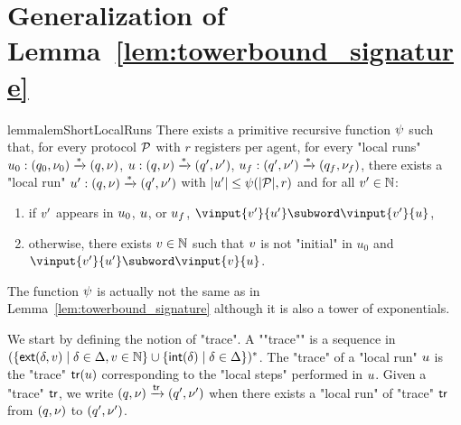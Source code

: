 \section{Generalization of Lemma~\ref{lem:towerbound_signature}}
\label{app:tower-lemma}
		
	\begin{restatable}{lemma}{lemShortLocalRuns}
	\label{lem:short-local-runs}
		There exists a primitive recursive function $\psi$ such that, for every protocol $\mathcal{P}$ with $r$ registers per agent, 
		for every "local runs" $u_0: (q_0, \nu_0) \xrightarrow{*} (q, \nu)$, $u: (q, \nu) \xrightarrow{*} (q', \nu')$, $u_f: (q', \nu') \xrightarrow{*} (q_f, \nu_f)$, there exists a "local run" $u': (q, \nu) \xrightarrow{*} (q', \nu')$ with $|u'| \leq \psi(|\mathcal{P}| ,r)$ and for all $v' \in \mathbb{N}$: 
		\begin{enumerate}
			\item if $v'$ appears in $u_0$, $u$, or $u_{f}$, $\vinput{\aval'}{\localrun'} \subword \vinput{\aval'}{\localrun}$,
			\item  otherwise, there exists $v \in \mathbb{N}$ such that $v$ is not "initial" in $u_0$ and $\vinput{\aval'}{\localrun'} \subword \vinput{\aval}{\localrun}$.
		\end{enumerate}
	\end{restatable}
	The function $\psi$ is actually not the same as in Lemma~\ref{lem:towerbound_signature} although it is also a tower of exponentials.
	
	We start by defining the notion of "trace". 
	\AP A ""trace"" is a sequence in $(\{\mathsf{ext}(\delta,v) \mid \delta \in \Delta, v \in \mathbb{N}\} \cup \{\mathsf{int}(\delta) \mid \delta \in \Delta\})^*$. The "trace" of a "local run" $u$ is the "trace" $\mathsf{tr}(u)$ corresponding to the "local steps" performed in $u$. Given a "trace" $\mathsf{tr}$, we write $(q,\nu) \xrightarrow{\mathsf{tr}} (q',\nu')$ when there exists a "local run" of "trace" $\mathsf{tr}$ from $(q,\nu)$ to $(q',\nu')$. 
	
	

